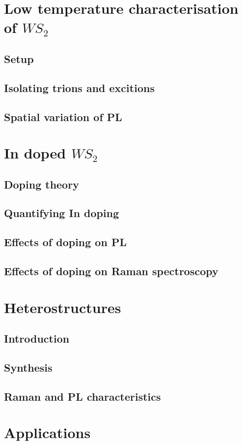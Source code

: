 \documentclass[12pt]{article}
\begin{document}
\section{Low temperature characterisation of $WS_2$}
	\subsection{Setup}
	\subsection{Isolating trions and excitions}
	\subsection{Spatial variation of PL}
\section{In doped $WS_2$}
	\subsection{Doping theory}
	\subsection{Quantifying In doping}
	\subsection{Effects of doping on PL}
	\subsection{Effects of doping on Raman spectroscopy}
\section{Heterostructures}
	\subsection{Introduction}
	\subsection{Synthesis}
	\subsection{Raman and PL characteristics}
\section{Applications}
\end{document}

